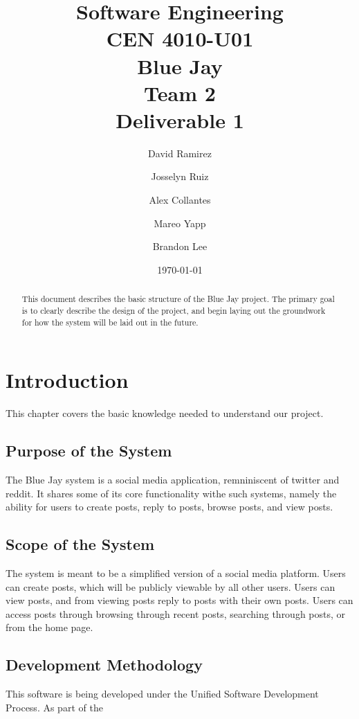 \documentclass[letter,12pt]{report}
\begin{document}
\title{Software Engineering\\CEN 4010-U01\\Blue Jay\\Team 2\\Deliverable 1}
\author{David Ramirez\and Josselyn Ruiz\and Alex Collantes\and Mareo Yapp\and Brandon Lee}
\date{\today}
\maketitle

\tableofcontents

\begin{abstract}
This document describes the basic structure of the Blue Jay project.
The primary goal is to clearly describe the design of the project,
and begin laying out the groundwork for how the system will be laid out
in the future.
\end{abstract}

\chapter{Introduction}
This chapter covers the basic knowledge needed to understand our project.

\section{Purpose of the System}
The Blue Jay system is a social media application,
remniniscent of twitter and reddit. It shares some of its
core functionality withe such systems, namely the ability for users
to create posts, reply to posts, browse posts, and view posts.


\section{Scope of the System}
The system is meant to be a simplified version of a social media platform.
Users can create posts, which will be publicly viewable by all other users.
Users can view posts, and from viewing posts reply to posts with their own
posts.
Users can access posts through browsing through recent posts, searching
through posts, or from the home page.



\section{Development Methodology}
This software is being developed under the Unified Software Development Process.
As part of the 
\end{document}
